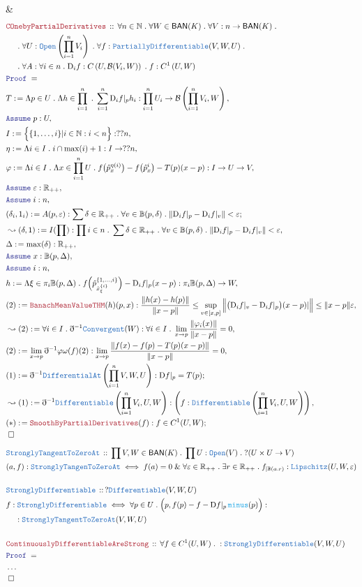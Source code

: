 \documentclass[12pt]{scrartcl}
\newcommand{\TYPE}[1]{\textcolor{NavyBlue}{\mathtt{#1}}}
\newcommand{\FUNC}[1]{\textcolor{Cerulean}{\mathtt{#1}}}
\newcommand{\LOGIC}[1]{\textcolor{Blue}{\mathtt{#1}}}
\newcommand{\THM}[1]{\textcolor{Maroon}{\mathtt{#1}}}
\renewcommand{\.}{\; . \;}
\newcommand{\de}{: \kern 0.1pc =}
\newcommand{\Theorem}[2]{& \THM{#1} \, :: \, #2 \\ & \Proof = \\ }
\newcommand{\DeclareType}[2]{& \TYPE{#1} \, :: \, #2 \\}
\newcommand{\DefineType}[3]{& #1 : \TYPE{#2} \iff #3 \\}
\newcommand{\NewLine}{\\ & \kern 1pc}
\newcommand{\Page}[1]{\begin{align*} #1 \end{align*}   }
\newcommand{ \bd }{ \ByDef }
\newcommand{\NoProof}{ & \ldots \\ \EndProof}
\renewcommand{\And}{\; \& \;}
\newcommand{\Reals}{\mathbb{R} }
\newcommand{\Nat}{\mathbb{N} }
\newcommand{\Say}[3]{& #1 \de #2 : #3, \\}
\newcommand{\Conclude}[3]{& #1 \de #2 : #3; \\}
\newcommand{\Derive}[3]{& \leadsto #1 \de #2 : #3, \\}
\newcommand{\A}{\LOGIC{Assume} \;}
\newcommand{\Assume}[2]{& \A #1 : #2, \\}
\newcommand{\QED}{\; \square}
\newcommand{\EndProof}{& \QED \\}
\newcommand{\ByDef}{\eth}
\newcommand{\Proof}{\LOGIC{Proof} \; }
\newcommand{\Ball}{ \mathbb{B} }
\newcommand{\BAN}{\mathsf{BAN}} %
\newcommand{\D}{\mathrm{D}}
\newcommand{\B}{\mathcal{B}}
\begin{document}
{	\EndProof
}\Page{
	\Theorem{COnebyPartialDerivatives}
	{
		\forall n \in \Nat \. 
		\forall W \in \BAN(K) \.
		\forall V : n \to \BAN(K) \.
		\NewLine \.
		\forall U : \TYPE{Open}\left( \prod^n_{i=1} V_i \right) \.
		\forall f : \TYPE{PartiallyDifferentiable}(V,W,U) \.
		\NewLine \.
		\forall A : \forall i \in n \. \D_i f : C\left(  U, \B(V_i,W)  \right) \.
		f : C^1\left( U, W \right)
	}
	\Say{T}{\Lambda p \in U \. \Lambda h \in \prod^n_{i = 1} \. \sum^n_{i = 1} \D_i f|_p h_i }{ \prod^n_{i = 1} U_i \to \B\left( \prod^n_{i = 1} V_i, W \right)  }
	\Assume{p}{ U }
	\Say{I}{ \Big\{ \{ 1,\ldots,i  \}  | i \in \Nat : i < n \Big\} }{??n}
	\Say{\eta}{\Lambda i \in I \.  i \cap \max(i) + 1}{I \to ??n}
	\Say{\varphi}{\Lambda i \in I \. \Lambda x \in \prod^n_{i = 1} U \. f\big( \hat p^{\eta(i)}_x \big) - f\big( \hat p^i_x \big) - T(p)(x - p) }{I \to U \to V}
	\Assume{\varepsilon}{\Reals_{++}}
	\Assume{i}{n}
	\Conclude{(\delta_i,1_i) }{A(p,\varepsilon)}{\sum \delta \in \Reals_{++} \. \forall v \in \Ball(p,\delta) \.  \| \D_i f |_p - \D_i f |_v \| < \varepsilon}
	\Derive{(\delta,1)}{I(\prod)}{\prod i \in n \. \sum \delta \in \Reals_{++} \. \forall v \in \Ball(p,\delta) \. \| \D_i f |_p - \D_i f |_v \| < \varepsilon}
	\Say{\Delta}{\max(\delta)}{\Reals_{++}}
	\Assume{x }{ \Ball(p,\Delta)}
	\Assume{i}{n}
	\Say{h}{\Lambda \xi \in \pi_i \Ball(p,\Delta) \. f\Big( \hat p^{\{1, \ldots, i \}}_{\hat x^{\{i\}}_{\xi}} \Big) - \D_i f|_p(x - p)}
	{ \pi_i \Ball(p,\Delta) \to W   }
	\Say{(2)}{\THM{BanachMeanValueTHM}(h)(p,x)}
	{
		\frac{ \| h(x) - h(p)\| }{ \|x - p\|} \le \sup_{v \in [x,p]} \Big\|\big( \D_i f |_v - \D_i f |_p \big)(x - p) |    \Big\| \le
		\| x - p \| \varepsilon
	}
	\Derive{(2)}{ \forall i \in I \. \bd^{-1} \TYPE{Convergent}(W)  }
	{
	  \forall i \in I \. \lim_{x \to p} \frac{\|\varphi_i(x)\|}{\|x - p\|}	 = 0	
	}
	\Say{(2)}{ \lim_{ x \to p}  \bd^{-1}\varphi \omega(f)(2)}{ \lim_{x \to p} \frac{\| f(x) - f(p) - T(p)(x -p) \|}{\|x - p \|} 
	  = 0
	}
	\Conclude{(1)}{\bd^{-1} \TYPE{DifferentialAt}\left( \prod^n_{i = 1}V, W,U\right)}
	{
		\D f |_p = T(p) 
	}
	\Derive{(1)}{ \bd^{-1} \TYPE{Differentiable}\left( \prod^n_{i = 1} V_i,U ,W \right) }
	{ \left(  f : \TYPE{Differentiable}\left(\prod^n_{i = 1} V_i,U,W \right) \right) }
	\Conclude{(*)}{\THM{SmoothByPartialDerivatives}(f)}{f \in C^1(U,W)}
	\EndProof
} \Page{
	\DeclareType{StronglyTangentToZeroAt}{\prod V,W \in \BAN(K) \. \prod U : \TYPE{Open}(V) \. ?(U \times U \to V)}
	\DefineType{(a,f)}{StronglyTangenToZeroAt}{ f(a) = 0 \And \forall \varepsilon \in \Reals_{++} \. 
		\exists r \in \Reals_{++} \.  f_{|\Ball(a.r)} : \TYPE{Lipschitz}(U,W,\varepsilon)  
	}
	\\
	\DeclareType{StronglyDifferentiable}{ ?\TYPE{Differentiable}(V,W,U) }
	\DefineType{f}{StronglyDifferentiable}{\forall p \in U \. \Big(p,f(p) - f - \D f |_p \, \FUNC{minus}(p) \Big) 
	 : \NewLine : \TYPE{StronglyTangentToZeroAt}(V,W,U)
	}
	\\
	\Theorem{ContinuouslyDifferentiableAreStrong}{ 
		\forall f \in C^1(U,W) \. : \TYPE{StronglyDifferentiable}(V,W,U)  }
	\NoProof
}
\newpage
\end{document}
